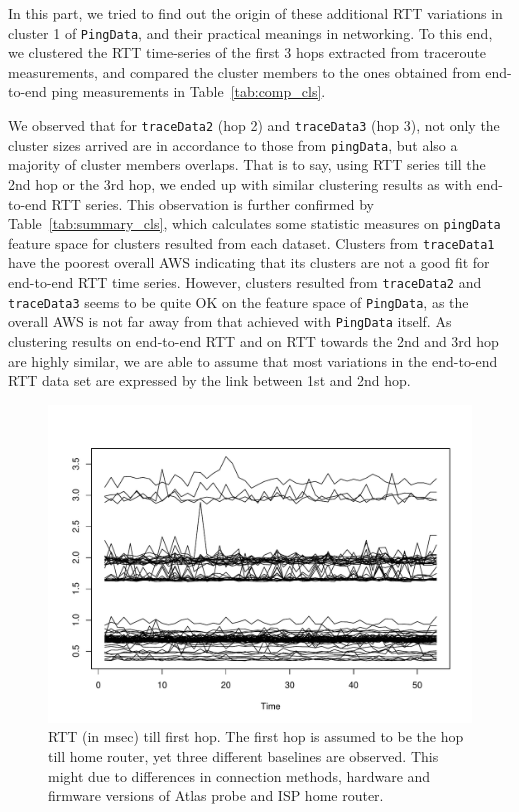 In this part, we tried to find out the origin of these additional RTT variations in cluster 1 of \texttt{PingData}, and their practical meanings in networking.
To this end, we clustered the RTT time-series of the first 3 hops extracted from traceroute measurements, and compared the cluster members to the ones obtained from end-to-end ping measurements in Table~\ref{tab:comp_cls}.

We observed that for \texttt{traceData2} (hop 2) and \texttt{traceData3} (hop 3), not only the cluster sizes arrived are in accordance to those from \texttt{pingData}, but also a majority of cluster members overlaps. 
That is to say, using RTT series till the 2nd hop or the 3rd hop, we ended up with similar clustering results as with end-to-end RTT series. 
This observation is further confirmed by Table~\ref{tab:summary_cls}, which calculates some statistic measures on \texttt{pingData} feature space for clusters resulted from each dataset. 
Clusters from \texttt{traceData1} have the poorest overall AWS indicating that its clusters are not a good fit for end-to-end RTT time series. 
However, clusters resulted from \texttt{traceData2} and \texttt{traceData3} seems to be quite OK on the feature space of \texttt{PingData}, as the overall AWS is not far away from that achieved with \texttt{PingData} itself.
As clustering results on end-to-end RTT and on RTT towards the 
2nd and 3rd hop are highly similar, we are able to assume that most variations in the end-to-end RTT data set are expressed by the link between 1st and 2nd hop.

\begin{figure}[!htb]
\centering
\includegraphics[width=.7\textwidth]{gfx/chap3/trace1_cls2_traceRTT.pdf}
\caption{RTT (in msec) till first hop. The first hop is assumed to be the hop till home router, yet three different baselines are observed. This might due to differences in connection methods, hardware and firmware versions of Atlas probe and ISP home router.}
\label{fig:trace1_traceRTT}
\end{figure}

